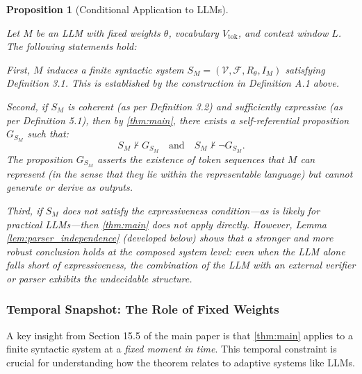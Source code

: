 \documentclass[11pt]{article}
\newtheorem{proposition}[theorem]{Proposition}
\begin{document}
\begin{proposition}[Conditional Application to LLMs]
\label{prop:llm_theorem_conditional}

Let $M$ be an LLM with fixed weights $\theta$, vocabulary $V_{\text{tok}}$, and context window $L$. The following statements hold:

First, $M$ induces a finite syntactic system $S_M = (\mathcal{V}, \mathcal{F}, R_\theta, I_M)$ satisfying Definition 3.1. This is established by the construction in Definition A.1 above.

Second, if $S_M$ is coherent (as per Definition 3.2) and sufficiently expressive (as per Definition 5.1), then by \ref{thm:main}, there exists a self-referential proposition $G_{S_M}$ such that:
\begin{equation}
S_M \not\vdash G_{S_M} \quad \text{and} \quad S_M \not\vdash \neg G_{S_M}.
\end{equation}
The proposition $G_{S_M}$ asserts the existence of token sequences that $M$ can represent (in the sense that they lie within the representable language) but cannot generate or derive as outputs.

Third, if $S_M$ does not satisfy the expressiveness condition—as is likely for practical LLMs—then \ref{thm:main} does not apply directly. However, Lemma \ref{lem:parser_independence} (developed below) shows that a stronger and more robust conclusion holds at the composed system level: even when the LLM alone falls short of expressiveness, the combination of the LLM with an external verifier or parser exhibits the undecidable structure.

\end{proposition}

\subsubsection{Temporal Snapshot: The Role of Fixed Weights}

A key insight from Section 15.5 of the main paper is that \ref{thm:main} applies to a finite syntactic system at a \textit{fixed moment in time}. This temporal constraint is crucial for understanding how the theorem relates to adaptive systems like LLMs.
\end{document}
